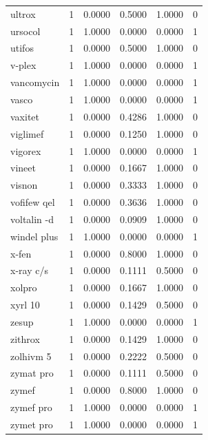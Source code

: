 \begin{longtable}{p{3.0cm}rrrrr}
ultrox & 1 & 0.0000 & 0.5000 & 1.0000 & 0 \\
ursocol & 1 & 1.0000 & 0.0000 & 0.0000 & 1 \\
utifos & 1 & 0.0000 & 0.5000 & 1.0000 & 0 \\
v-plex & 1 & 1.0000 & 0.0000 & 0.0000 & 1 \\
vancomycin & 1 & 1.0000 & 0.0000 & 0.0000 & 1 \\
vasco & 1 & 1.0000 & 0.0000 & 0.0000 & 1 \\
vaxitet & 1 & 0.0000 & 0.4286 & 1.0000 & 0 \\
viglimef & 1 & 0.0000 & 0.1250 & 1.0000 & 0 \\
vigorex & 1 & 1.0000 & 0.0000 & 0.0000 & 1 \\
vineet & 1 & 0.0000 & 0.1667 & 1.0000 & 0 \\
visnon & 1 & 0.0000 & 0.3333 & 1.0000 & 0 \\
vofifew qel & 1 & 0.0000 & 0.3636 & 1.0000 & 0 \\
voltalin -d & 1 & 0.0000 & 0.0909 & 1.0000 & 0 \\
windel plus & 1 & 1.0000 & 0.0000 & 0.0000 & 1 \\
x-fen & 1 & 0.0000 & 0.8000 & 1.0000 & 0 \\
x-ray c/s & 1 & 0.0000 & 0.1111 & 0.5000 & 0 \\
xolpro & 1 & 0.0000 & 0.1667 & 1.0000 & 0 \\
xyrl 10 & 1 & 0.0000 & 0.1429 & 0.5000 & 0 \\
zesup & 1 & 1.0000 & 0.0000 & 0.0000 & 1 \\
zithrox & 1 & 0.0000 & 0.1429 & 1.0000 & 0 \\
zolhivm 5 & 1 & 0.0000 & 0.2222 & 0.5000 & 0 \\
zymat pro & 1 & 0.0000 & 0.1111 & 0.5000 & 0 \\
zymef & 1 & 0.0000 & 0.8000 & 1.0000 & 0 \\
zymef pro & 1 & 1.0000 & 0.0000 & 0.0000 & 1 \\
zymet pro & 1 & 1.0000 & 0.0000 & 0.0000 & 1 \\
\end{longtable}
\endgroup
